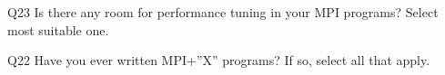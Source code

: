 \begin{description}%
\item{Q23} Is there any room for performance tuning in your MPI programs? Select most suitable one.%
\item{Q22} Have you ever written MPI+”X” programs? If so, select all that apply.%
\end{description}%
